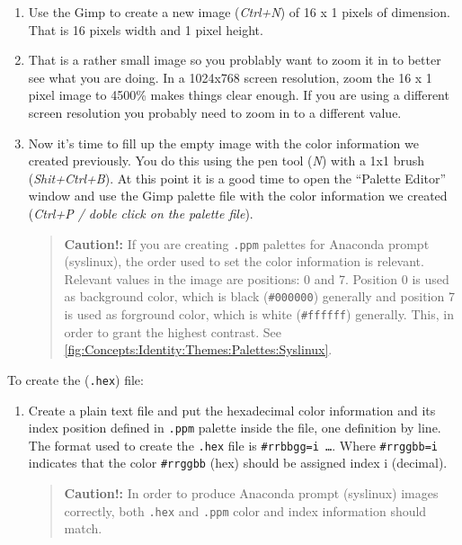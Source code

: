 \begin{enumerate}

\item Use the Gimp to create a new image (\textit{Ctrl+N}) of 16 x 1
pixels of dimension.  That is 16 pixels width and 1 pixel height.
      
\item That is a rather small image so you problably want to zoom it in
to better see what you are doing. In a 1024x768 screen resolution,
zoom the 16 x 1 pixel image to 4500\% makes things clear enough. If
you are using a different screen resolution you probably need to zoom
in to a different value. 

\item Now it's time to fill up the empty image with the color
information we created previously. You do this using the pen tool
(\textit{N}) with a 1x1 brush (\textit{Shit+Ctrl+B}). At this point it
is a good time to open the ``Palette Editor'' window and use the Gimp
palette file with the color information we created (\textit{Ctrl+P /
doble click on the palette file}).

\begin{quote} 

\textbf{Caution!:} If you are creating \texttt{.ppm} palettes for
Anaconda prompt (syslinux), the order used to set the color
information is relevant. Relevant values in the image are positions: 0
and 7.  Position 0 is used as background color, which is black
(\texttt{\#000000}) generally and position 7 is used as forground
color, which is white (\texttt{\#ffffff}) generally. This, in order to
grant the highest contrast.  See
\autoref{fig:Concepts:Identity:Themes:Palettes:Syslinux}.

\end{quote}
      
\end{enumerate}

To create the (\texttt{.hex}) file:

\begin{enumerate}

\item Create a plain text file and put the hexadecimal color
information and its index position defined in \texttt{.ppm} palette
inside the file, one definition by line.  The format used to create
the \texttt{.hex} file is \texttt{\#rrbbgg=i \dots}.  Where
\texttt{\#rrggbb=i} indicates that the color \texttt{\#rrggbb} (hex)
should be assigned index i (decimal).

\begin{quote}
\textbf{Caution!:} In order to produce Anaconda prompt (syslinux)
images correctly, both \texttt{.hex} and \texttt{.ppm} color and index
information should match.
\end{quote}

\end{enumerate}

